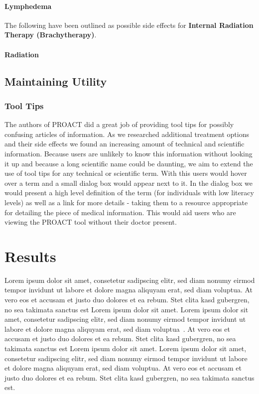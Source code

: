 \documentclass[journal]{vgtc}                %
\begin{document}
                        \paragraph{Lymphedema}

                        The following have been outlined as possible side effects for \textbf{Internal Radiation Therapy (Brachytherapy)}.
                        \paragraph{Radiation}


        \subsection{Maintaining Utility}
                \subsubsection{Tool Tips}
                        The authors of PROACT did a great job of providing tool tips for possibly confusing articles of information.
                        As we researched additional treatment options and their side effects we found an increasing amount of technical and scientific information.
                        Because users are unlikely to know this information without looking it up and because a long scientific name could be daunting, we aim to extend the use of tool tips for any technical or scientific term.
                        With this users would hover over a term and a small dialog box would appear next to it.
                        In the dialog box we would present a high level definition of the term (for individuals with low literacy levels) as well as a link for more details - taking them to a resource appropriate for detailing the piece of medical information.
                        This would aid users who are viewing the PROACT tool without their doctor present.

\section{Results}

Lorem ipsum dolor sit amet, consetetur sadipscing elitr, sed diam
nonumy eirmod tempor invidunt ut labore et dolore magna aliquyam erat,
sed diam voluptua. At vero eos et accusam et justo duo dolores et ea
rebum. Stet clita kasd gubergren, no sea takimata sanctus est Lorem
ipsum dolor sit amet. Lorem ipsum dolor sit amet, consetetur
sadipscing elitr, sed diam nonumy eirmod tempor invidunt ut labore et
dolore magna aliquyam erat, sed diam
voluptua~\cite{Kitware:2003,Max:1995:OMF}. At vero eos et accusam et
justo duo dolores et ea rebum. Stet clita kasd gubergren, no sea
takimata sanctus est Lorem ipsum dolor sit amet. Lorem ipsum dolor sit
amet, consetetur sadipscing elitr, sed diam nonumy eirmod tempor
invidunt ut labore et dolore magna aliquyam erat, sed diam
voluptua. At vero eos et accusam et justo duo dolores et ea
rebum. Stet clita kasd gubergren, no sea takimata sanctus est.
\end{document}
